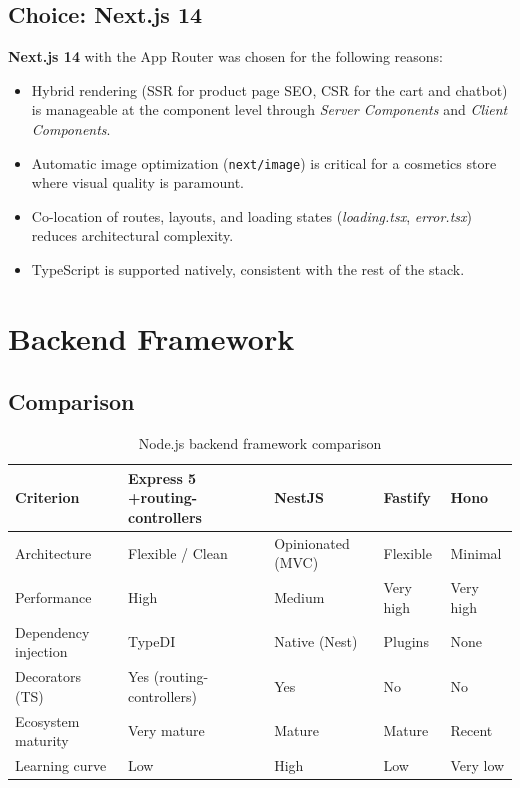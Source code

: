 \subsection{Choice: Next.js 14}

\textbf{Next.js 14} with the App Router was chosen for the following reasons:
\begin{itemize}
  \item Hybrid rendering (SSR for product page SEO, CSR for the cart and chatbot)
        is manageable at the component level through \textit{Server Components}
        and \textit{Client Components}.
  \item Automatic image optimization (\texttt{next/image}) is critical for a
        cosmetics store where visual quality is paramount.
  \item Co-location of routes, layouts, and loading states (\textit{loading.tsx},
        \textit{error.tsx}) reduces architectural complexity.
  \item TypeScript is supported natively, consistent with the rest of the stack.
\end{itemize}

\section{Backend Framework}

\subsection{Comparison}

\begin{table}[H]
\centering
\caption{Node.js backend framework comparison}
\begin{tabularx}{\textwidth}{|l|X|X|X|X|}
\hline
\rowcolor{gray!20}
\textbf{Criterion} & \textbf{Express 5 +\newline routing-controllers} & \textbf{NestJS} & \textbf{Fastify} & \textbf{Hono} \\
\hline
Architecture & \cellcolor{green!15}Flexible / Clean & Opinionated (MVC) & Flexible & Minimal \\
\hline
Performance & High & Medium & \cellcolor{green!15}Very high & Very high \\
\hline
Dependency injection & \cellcolor{green!15}TypeDI & Native (Nest) & Plugins & None \\
\hline
Decorators (TS) & \cellcolor{green!15}Yes (routing-controllers) & Yes & No & No \\
\hline
Ecosystem maturity & \cellcolor{green!15}Very mature & Mature & Mature & Recent \\
\hline
Learning curve & Low & High & Low & Very low \\
\hline
\end{tabularx}
\end{table}


